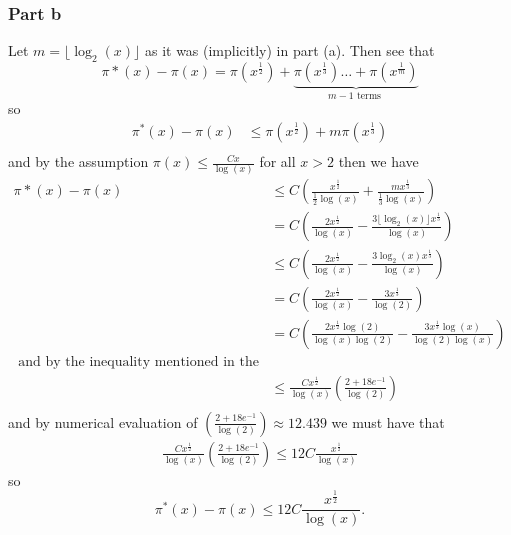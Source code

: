 \documentclass{unswmaths}
\begin{document}
\subsubsection*{Part b}
Let $ m = \lfloor \log_2(x) \rfloor $ as it was (implicitly) in part (a).
Then see that 
$$ 
	\pi*(x) - \pi(x) = \pi(x^\frac{1}{2}) + \underbrace{\pi(x^\frac{1}{3}) \ldots + \pi(x^\frac{1}{m})}_{m-1 \text{ terms }} 
$$
so 
\begin{align*}
	\pi^*(x) - \pi(x) &\leq \pi(x^\frac{1}{2}) + m\pi(x^\frac{1}{3}) \\
\end{align*}
and by the assumption $ \pi(x) \leq \frac{Cx}{\log(x)} $ for  all $ x > 2 $ then we have
\begin{align*}
	\pi*(x) - \pi(x) &\leq C\left( \frac{x^\frac{1}{2}}{\frac{1}{2}\log(x)} + \frac{mx^\frac{1}{3}}{\frac{1}{3}\log(x)} \right) \\
	&= C\left(\frac{2x^\frac{1}{2}}{\log(x)} - \frac{3\lfloor \log_2(x) \rfloor x^\frac{1}{3}}{\log(x)} \right) \\
	&\leq C\left(\frac{2x^\frac{1}{2}}{\log(x)} - \frac{3 \log_2(x) x^\frac{1}{3}}{\log(x)} \right) \\
	&= C\left(\frac{2x^\frac{1}{2}}{\log(x)} - \frac{3 x^\frac{1}{3}}{\log(2)} \right) \\
	&= C\left(\frac{2x^\frac{1}{2}\log(2)}{\log(x)\log(2)} - \frac{3 x^\frac{1}{3}\log(x)}{\log(2)\log(x)} \right) \\
    \text{ and by the inequality mentioned in the question we have} \\
    &\leq \frac{Cx^\frac{1}{2}}{\log(x)} \left(\frac{2+18e^{-1}}{\log(2)}\right) \\
\end{align*}
and by numerical evaluation of $ \left(\frac{2+18e^{-1}}{\log(2)}\right) \approx 12.439 $ we must have that
\begin{align*}
    \frac{Cx^\frac{1}{2}}{\log(x)} \left(\frac{2+18e^{-1}}{\log(2)}\right) \leq 12C \frac{x^\frac{1}{2}}{\log(x)}
\end{align*}
so 
$$
    \pi^*(x) - \pi(x) \leq 12C \frac{x^\frac{1}{2}}{\log(x)}.
$$
\end{document}
